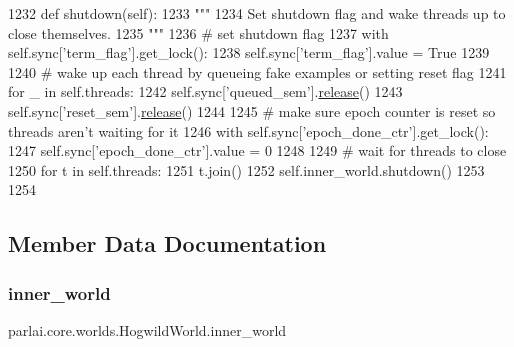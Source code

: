 \begin{DoxyCode}
1232     \textcolor{keyword}{def }shutdown(self):
1233         \textcolor{stringliteral}{"""}
1234 \textcolor{stringliteral}{        Set shutdown flag and wake threads up to close themselves.}
1235 \textcolor{stringliteral}{        """}
1236         \textcolor{comment}{# set shutdown flag}
1237         with self.sync[\textcolor{stringliteral}{'term\_flag'}].get\_lock():
1238             self.sync[\textcolor{stringliteral}{'term\_flag'}].value = \textcolor{keyword}{True}
1239 
1240         \textcolor{comment}{# wake up each thread by queueing fake examples or setting reset flag}
1241         \textcolor{keywordflow}{for} \_ \textcolor{keywordflow}{in} self.threads:
1242             self.sync[\textcolor{stringliteral}{'queued\_sem'}].\hyperlink{namespaceconf_a325dc746d8bf05c54d26351c35a21d90}{release}()
1243             self.sync[\textcolor{stringliteral}{'reset\_sem'}].\hyperlink{namespaceconf_a325dc746d8bf05c54d26351c35a21d90}{release}()
1244 
1245         \textcolor{comment}{# make sure epoch counter is reset so threads aren't waiting for it}
1246         with self.sync[\textcolor{stringliteral}{'epoch\_done\_ctr'}].get\_lock():
1247             self.sync[\textcolor{stringliteral}{'epoch\_done\_ctr'}].value = 0
1248 
1249         \textcolor{comment}{# wait for threads to close}
1250         \textcolor{keywordflow}{for} t \textcolor{keywordflow}{in} self.threads:
1251             t.join()
1252         self.inner\_world.shutdown()
1253 
1254 
\end{DoxyCode}


\subsection{Member Data Documentation}
\mbox{\label{classparlai_1_1core_1_1worlds_1_1HogwildWorld_a4138f2e9cd59f349ac7b737256faf383}} 
\subsubsection{\texorpdfstring{inner\+\_\+world}{inner\_world}}
{\footnotesize\ttfamily parlai.\+core.\+worlds.\+Hogwild\+World.\+inner\+\_\+world}




